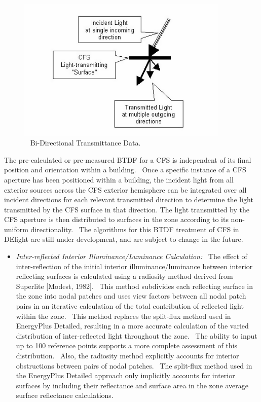 \begin{figure}[hbtp] %
\centering
\includegraphics[width=0.9\textwidth, height=0.9\textheight, keepaspectratio=true]{media/image827.png}
\caption{  Bi-Directional Transmittance Data. \protect \label{fig:bi-directional-transmittance-data.}}
\end{figure}

The pre-calculated or pre-measured BTDF for a CFS is independent of its final position and orientation within a building.~ Once a specific instance of a CFS aperture has been positioned within a building, the incident light from all exterior sources across the CFS exterior hemisphere can be integrated over all incident directions for each relevant transmitted direction to determine the light transmitted by the CFS surface in that direction. The light transmitted by the CFS aperture is then distributed to surfaces in the zone according to its non-uniform directionality.~ The algorithms for this BTDF treatment of CFS in DElight are still under development, and are subject to change in the future.

\begin{itemize}
\tightlist
\item
  \emph{Inter-reflected Interior Illuminance/Luminance Calculation:}~ The effect of inter-reflection of the initial interior illuminance/luminance between interior reflecting surfaces is calculated using a radiosity method derived from Superlite {[}Modest, 1982{]}.~ This method subdivides each reflecting surface in the zone into nodal patches and uses view factors between all nodal patch pairs in an iterative calculation of the total contribution of reflected light within the zone.~ This method replaces the split-flux method used in EnergyPlus Detailed, resulting in a more accurate calculation of the varied distribution of inter-reflected light throughout the zone.~ The ability to input up to 100 reference points supports a more complete assessment of this distribution.~ Also, the radiosity method explicitly accounts for interior obstructions between pairs of nodal patches.~ The split-flux method used in the EnergyPlus Detailed approach only implicitly accounts for interior surfaces by including their reflectance and surface area in the zone average surface reflectance calculations.
\end{itemize}

